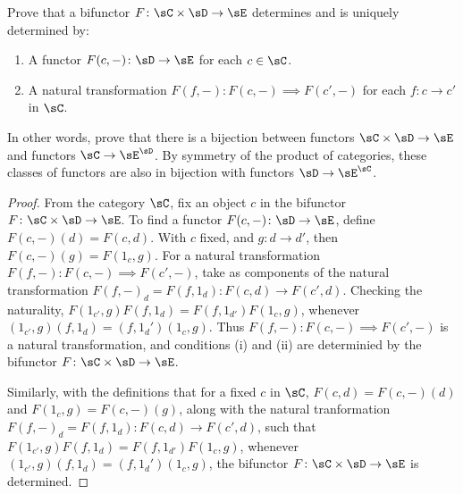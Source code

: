 

\begin{exercise}
	Prove that a bifunctor $F\colon \sC \times \sD \rightarrow \sE$ determines and is
	uniquely determined by:
	\begin{enumerate}
		\item A functor $F(c,-)\colon\sD \rightarrow \sE$ for each $c \in \sC$.
		\item A natural transformation $F(f,-)\colon F(c,-) \implies F(c',-)$
			for each $f\colon c \rightarrow c'$ in $\sC$.
	\end{enumerate}
	In other words, prove that there is a bijection between functors $\sC \times
	\sD \rightarrow \sE$ and functors $\sC \rightarrow \sE^\sD $. By symmetry of the product
	of categories, these classes of functors are also in bijection with functors
	\(\sD\to\sE^\sC\).
\end{exercise}

\begin{proof}
	From the category $\sC$, fix an object $c$ in the bifunctor $F\colon \sC \times
	\sD
	\rightarrow \sE$. To find a functor $F(c,-)\colon\sD \rightarrow \sE$, define
	$F(c,-)(d) = F(c,d)$. With $c$ fixed, and $g\colon d \rightarrow d'$, then
	$F(c,-)(g) = F(1_c, g)$. For a natural transformation $F(f,-)\colon F(c,-)
	\implies F(c',-)$, take as components of the natural transformation
	$F(f,-)_d = F(f, 1_d) \colon F(c,d) \rightarrow F(c',d)$. Checking the
	naturality, $F(1_{c'}, g) F(f, 1_d) = F(f, 1_{d'}) F(1_c, g)$, whenever
	$(1_{c'}, g)(f, 1_d) = (f, 1_d')(1_c,g)$. Thus $F(f,-)\colon F(c,-) \implies
	F(c',-)$ is a natural transformation, and conditions (i) and (ii) are
	determinied by the bifunctor $F\colon \sC \times \sD \rightarrow \sE$.

	Similarly, with the definitions that for a fixed $c$ in $\sC$, $F(c,d) =
	F(c,-)(d)$ and $F(1_c, g) = F(c,-)(g)$, along with the natural tranformation
	$F(f,-)_d = F(f, 1_d) \colon F(c,d) \rightarrow F(c',d)$, such that $F(1_{c'}, g)
	F(f, 1_d) = F(f, 1_{d'}) F(1_c, g)$, whenever $(1_{c'}, g)(f, 1_d) = (f,
	1_d')(1_c,g)$, the bifunctor $F\colon \sC \times \sD \rightarrow \sE$ is determined.
\end{proof}


